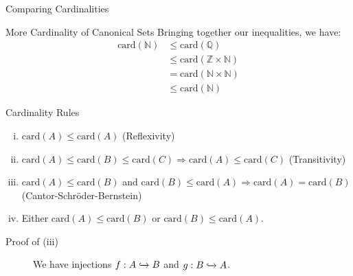 \documentclass[8pt]{extarticle}
\begin{document}
\begin{problem}{Comparing Cardinalities}
\begin{problem}{More Cardinality of Canonical Sets}
      Bringing together our inequalities, we have:
      \begin{align*}
        \text{card}(\mathbb{N}) &\leq \text{card}(\mathbb{Q})\\
                                &\leq \text{card}(\mathbb{Z}\times \mathbb{N})\\
                                &=\text{card}(\mathbb{N}\times \mathbb{N})\\
                                &\leq \text{card}(\mathbb{N})
      \end{align*}
    \end{problem}
    \begin{problem}{Cardinality Rules}
      \begin{enumerate}[(i)]
        \item $\text{card}(A) \leq \text{card}(A)$ (Reflexivity)
        \item $\text{card}(A)\leq \text{card}(B) \leq \text{card}(C)\Rightarrow \text{card}(A) \leq \text{card}(C)$ (Transitivity)
        \item $\text{card}(A) \leq \text{card}(B)$ and $\text{card}(B) \leq \text{card}(A) \Rightarrow \text{card}(A) = \text{card}(B)$ (Cantor-Schröder-Bernstein)
        \item Either $\text{card}(A) \leq \text{card}(B)$ or $\text{card}(B) \leq \text{card}(A)$.
      \end{enumerate}
      \tcblower
      \begin{description}
        \item[Proof of (iii)] We have injections $f: A\xhookrightarrow{}B$ and $g:B\xhookrightarrow{} A$.\\


\end{description}
\end{problem}
\end{problem}
\end{document}
